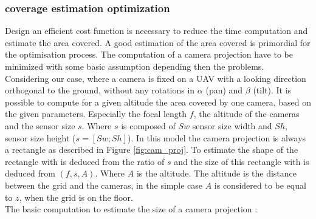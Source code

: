 \subsubsection{coverage estimation optimization} 
Design an efficient cost function is necessary to reduce the time computation and estimate the area covered. A good estimation of the area covered is primordial for the optimisation process. 
  The computation of a camera projection have to be minimized with some basic assumption depending then the problems.\\
Considering our case, where a camera is fixed on a UAV with a looking direction orthogonal to the ground, without any rotations in $\alpha$ (pan) and $\beta$ (tilt). It is possible to compute for a given altitude the area covered by one camera, based on the given parameters. Especially the focal length $f$, the altitude of the cameras and the sensor size $s$. Where $s$ is composed of $Sw$ sensor size width and $Sh$, sensor size height ($s= [Sw ; Sh]$). 
In this model the camera projection is always a rectangle as described in Figure \ref{fig:cam_proj}. To estimate the shape of the rectangle with is deduced from the ratio of $s$ and the size of this rectangle with is deduced from $(f ,s ,A)$. Where $A$ is the altitude. The altitude is the distance between the grid and the cameras, in the simple case $A$ is considered to be equal to $z$, when the grid is on the floor.  \\
The basic computation to estimate the size of a camera projection :

